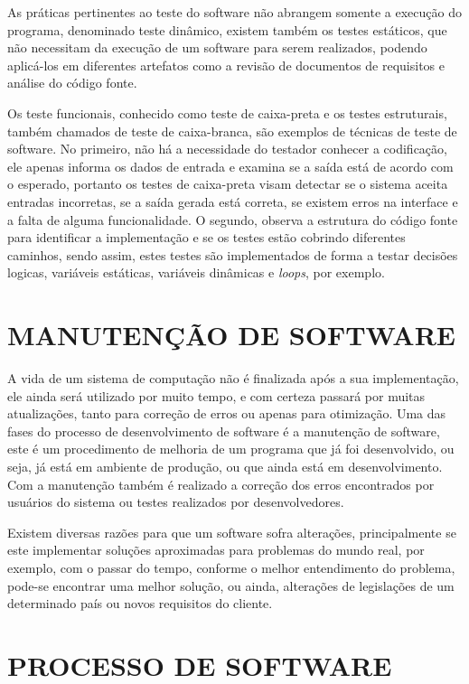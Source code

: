 As práticas pertinentes ao teste do software não abrangem somente a execução do programa, denominado teste dinâmico, existem também os testes estáticos, que não necessitam da execução de um software para serem realizados, podendo aplicá-los em diferentes artefatos como a revisão de documentos de requisitos e análise do código fonte.\cite{Pedro}

Os teste funcionais, conhecido como teste de caixa-preta e os testes estruturais, também chamados de teste de caixa-branca, são exemplos de técnicas de teste de software. No primeiro, não há a necessidade do testador conhecer a codificação, ele apenas informa os dados de entrada e examina se a saída está de acordo com o esperado, portanto os testes de caixa-preta visam detectar se o sistema aceita entradas incorretas, se a saída gerada está correta, se existem erros na interface e a falta de alguma funcionalidade. O segundo, observa a estrutura do código fonte para identificar a implementação e se os testes estão cobrindo diferentes caminhos, sendo assim, estes testes são implementados de forma a testar decisões logicas, variáveis estáticas, variáveis dinâmicas e \textit{loops}, por exemplo.\cite{Pedro}


\section{MANUTENÇÃO DE SOFTWARE}
\label{sec:manutencaoDeSoftware}

A vida de um sistema de computação não é finalizada após a sua implementação, ele ainda será utilizado por muito tempo, e com certeza passará por muitas atualizações, tanto para correção de erros ou apenas para otimização. Uma das fases do processo de desenvolvimento de software é a manutenção de software, este é um procedimento de melhoria de um programa que já foi desenvolvido, ou seja, já está em ambiente de produção, ou que ainda está em desenvolvimento. Com a manutenção também é realizado a correção dos erros encontrados por usuários do sistema ou testes realizados por desenvolvedores.

Existem diversas razões para que um software sofra alterações, principalmente se este implementar soluções aproximadas para problemas do mundo real, por exemplo, com o passar do tempo, conforme o melhor entendimento do problema, pode-se encontrar uma melhor solução, ou ainda, alterações de legislações de um determinado país ou novos requisitos do cliente.


\cite{rodrigoSpinola2011}

\section{PROCESSO DE SOFTWARE}
\label{sec:processoDeSoftware}